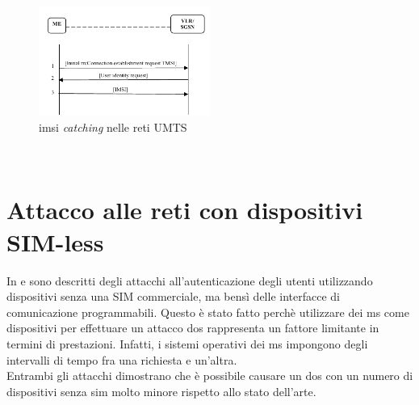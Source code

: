 \begin{figure}[h]
    \centering
    \includegraphics[width=0.5\textwidth]{images/imsi-catch-umts.png}
    \caption{\gls{imsi} \textit{catching} nelle reti UMTS\cite{dos-imsi}}
\end{figure}\\

\clearpage

\section{Attacco alle reti con dispositivi SIM-less}
In \cite{umts-dos} e \cite{gsm-dos-simless} sono descritti degli attacchi all'autenticazione degli utenti utilizzando dispositivi senza una SIM commerciale, ma bensì delle interfacce di comunicazione 
programmabili. Questo è stato fatto perchè utilizzare dei \gls{ms} come dispositivi per effettuare un attacco \gls{dos} rappresenta un fattore limitante in termini di prestazioni. Infatti, 
i sistemi operativi dei \gls{ms} impongono degli intervalli di tempo fra una richiesta e un'altra.\\
Entrambi gli attacchi dimostrano che è possibile causare un \gls{dos} con un numero di dispositivi senza \gls{sim} molto minore rispetto allo stato dell'arte. 

